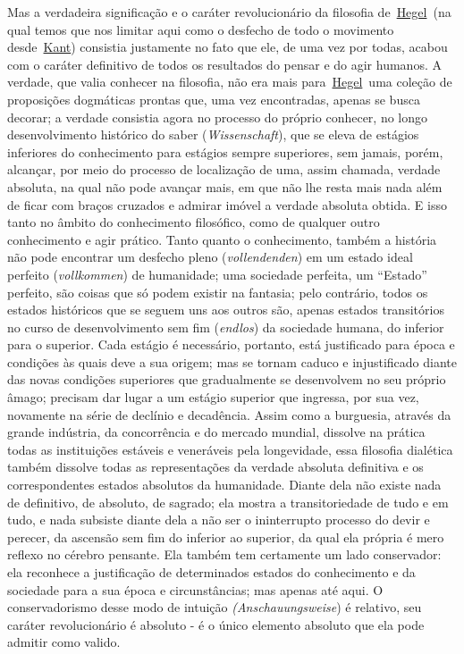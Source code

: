 Mas a verdadeira significação e o caráter revolucionário da filosofia
de~\href{https://www.marxists.org/portugues/dicionario/verbetes/h/hegel.htm}{Hegel}~(na
qual temos que nos limitar aqui como o desfecho de todo o movimento
desde~\href{https://www.marxists.org/portugues/dicionario/verbetes/k/kant.htm}{Kant})
consistia justamente no fato que ele, de uma vez por todas, acabou com o
caráter definitivo de todos os resultados do pensar e do agir humanos. A
verdade, que valia conhecer na filosofia, não era mais
para~\href{https://www.marxists.org/portugues/dicionario/verbetes/h/hegel.htm}{Hegel}~uma
coleção de proposições dogmáticas prontas que, uma vez encontradas,
apenas se busca decorar; a verdade consistia agora no processo do
próprio conhecer, no longo desenvolvimento histórico do saber
(\emph{Wissenschaft}), que se eleva de estágios inferiores do
conhecimento para estágios sempre superiores, sem jamais, porém,
alcançar, por meio do processo de localização de uma, assim chamada,
verdade absoluta, na qual não pode avançar mais, em que não lhe resta
mais nada além de ficar com braços cruzados e admirar imóvel a verdade
absoluta obtida. E isso tanto no âmbito do conhecimento filosófico, como
de qualquer outro conhecimento e agir prático. Tanto quanto o
conhecimento, também a história não pode encontrar um desfecho pleno
(\emph{vollendenden}) em um estado ideal perfeito (\emph{vollkommen}) de
humanidade; uma sociedade perfeita, um ``Estado'' perfeito, são coisas
que só podem existir na fantasia; pelo contrário, todos os estados
históricos que se seguem uns aos outros são, apenas estados transitórios
no curso de desenvolvimento sem fim (\emph{endlos}) da sociedade humana,
do inferior para o superior. Cada estágio é necessário, portanto, está
justificado para época e condições às quais deve a sua origem; mas se
tornam caduco e injustificado diante das novas condições superiores que
gradualmente se desenvolvem no seu próprio âmago; precisam dar lugar a
um estágio superior que ingressa, por sua vez, novamente na série de
declínio e decadência. Assim como a burguesia, através da grande
indústria, da concorrência e do mercado mundial, dissolve na prática
todas as instituições estáveis e veneráveis pela longevidade, essa
filosofia dialética também dissolve todas as representações da verdade
absoluta definitiva e os correspondentes estados absolutos da
humanidade. Diante dela não existe nada de definitivo, de absoluto, de
sagrado; ela mostra a transitoriedade de tudo e em tudo, e nada subsiste
diante dela a não ser o ininterrupto processo do devir e perecer, da
ascensão sem fim do inferior ao superior, da qual ela própria é mero
reflexo no cérebro pensante. Ela também tem certamente um lado
conservador: ela reconhece a justificação de determinados estados do
conhecimento e da sociedade para a sua época e circunstâncias; mas
apenas até aqui. O conservadorismo desse modo de intuição
\emph{(Anschauungsweise}) é relativo, seu caráter revolucionário é
absoluto - é o único elemento absoluto que ela pode admitir como valido.

